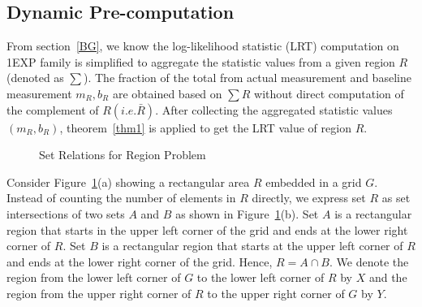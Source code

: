 \documentclass[10pt,journal,cspaper,compsoc]{IEEEtran}
\begin{document}
\subsection{Dynamic Pre-computation}
\label{sec:mov2}
From section~\ref{BG}, we know the log-likelihood statistic (LRT) computation on 1EXP family is simplified to aggregate the statistic values from a given region $R$ (denoted as $\sum $). The fraction of the total from actual measurement and baseline measurement $m_R,b_R$ are obtained based on $\sum R$ without direct computation of the complement of $R (i.e. \bar R)$. After collecting the aggregated statistic values $(m_R,b_R)$, theorem~\ref{thm1} is applied to get the LRT value of region $R$.
\begin{figure}[h]
     \begin{center}
\end{center}
\vspace{-10pt}
\caption{Set Relations for Region Problem}\label{fig:example}
\end{figure}


Consider Figure~\ref{fig:example}(a) showing a rectangular area $R$ embedded in a grid $G$. Instead of counting the number of elements in $R$ directly, we express set $R$ as set intersections of two sets $A$ and $B$ as shown in Figure~\ref{fig:example}(b). Set $A$ is a rectangular region that starts in the upper left corner of the grid and ends at the lower right corner of $R$. Set $B$ is a rectangular region that starts at the upper left corner of $R$ and ends at the lower right corner of the grid. Hence, $R=A \cap B$. We denote the region from the lower left corner of $G$ to the lower left corner of $R$ by $X$ and the region from the upper right corner of $R$ to the upper right corner of $G$ by $Y$.
\end{document}
